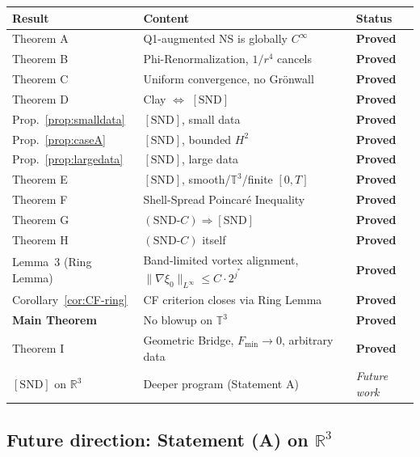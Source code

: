 \documentclass[11pt]{article}
\newcommand{\T}{\mathbb{T}}
\newcommand{\R}{\mathbb{R}}
\begin{document}
\begin{center}
\renewcommand{\arraystretch}{1.22}
\begin{tabular}{lll}
\hline
Result & Content & Status\\
\hline
Theorem A & Q1-augmented NS is globally $C^\infty$ & \textbf{Proved}\\
Theorem B & Phi-Renormalization, $1/r^4$ cancels & \textbf{Proved}\\
Theorem C & Uniform convergence, no Gr\"onwall & \textbf{Proved}\\
Theorem D & Clay $\Leftrightarrow$ $[\mathrm{SND}]$ & \textbf{Proved}\\
Prop.~\ref{prop:smalldata} & $[\mathrm{SND}]$, small data & \textbf{Proved}\\
Prop.~\ref{prop:caseA} & $[\mathrm{SND}]$, bounded $H^2$ & \textbf{Proved}\\
Prop.~\ref{prop:largedata} & $[\mathrm{SND}]$, large data & \textbf{Proved}\\
Theorem E & $[\mathrm{SND}]$, smooth/$\T^3$/finite $[0,T]$ & \textbf{Proved}\\
Theorem F & Shell-Spread Poincar\'e Inequality & \textbf{Proved}\\
Theorem G & $(\mathrm{SND}\text{-}C)\Rightarrow[\mathrm{SND}]$ & \textbf{Proved}\\
Theorem H & $(\mathrm{SND}\text{-}C)$ itself & \textbf{Proved}\\
Lemma~3 (Ring Lemma) & Band-limited vortex alignment, $\|\nabla\xi_0\|_{L^\infty}\leq C\cdot 2^{j^*}$ & \textbf{Proved}\\
Corollary~\ref{cor:CF-ring} & CF criterion closes via Ring Lemma & \textbf{Proved}\\
\hline
\textbf{Main Theorem} & No blowup on $\T^3$ & \textbf{Proved}\\
\hline
Theorem I & Geometric Bridge, $F_{\min}\to 0$, arbitrary data & \textbf{Proved}\\
\hline
$[\mathrm{SND}]$ on $\R^3$ & Deeper program (Statement A) & \textit{Future work}\\
\hline
\end{tabular}
\end{center}

\subsection{Future direction: Statement (A) on $\R^3$}
\end{document}
